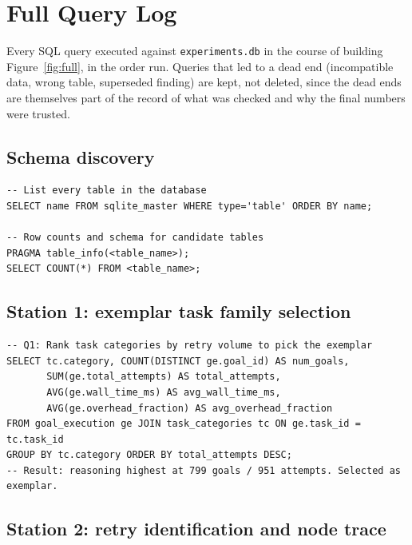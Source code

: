 \documentclass[10pt]{article}
\begin{document}
\appendix

\section{Full Query Log}
\label{app:queries}

Every SQL query executed against \texttt{experiments.db} in the course of
building Figure~\ref{fig:full}, in the order run. Queries that led to a dead end
(incompatible data, wrong table, superseded finding) are kept, not deleted,
since the dead ends are themselves part of the record of what was checked
and why the final numbers were trusted.

\subsection{Schema discovery}

\begin{lstlisting}
-- List every table in the database
SELECT name FROM sqlite_master WHERE type='table' ORDER BY name;

-- Row counts and schema for candidate tables
PRAGMA table_info(<table_name>);
SELECT COUNT(*) FROM <table_name>;
\end{lstlisting}

\subsection{Station 1: exemplar task family selection}

\begin{lstlisting}
-- Q1: Rank task categories by retry volume to pick the exemplar
SELECT tc.category, COUNT(DISTINCT ge.goal_id) AS num_goals,
       SUM(ge.total_attempts) AS total_attempts,
       AVG(ge.wall_time_ms) AS avg_wall_time_ms,
       AVG(ge.overhead_fraction) AS avg_overhead_fraction
FROM goal_execution ge JOIN task_categories tc ON ge.task_id = tc.task_id
GROUP BY tc.category ORDER BY total_attempts DESC;
-- Result: reasoning highest at 799 goals / 951 attempts. Selected as exemplar.
\end{lstlisting}

\subsection{Station 2: retry identification and node trace}
\end{document}

